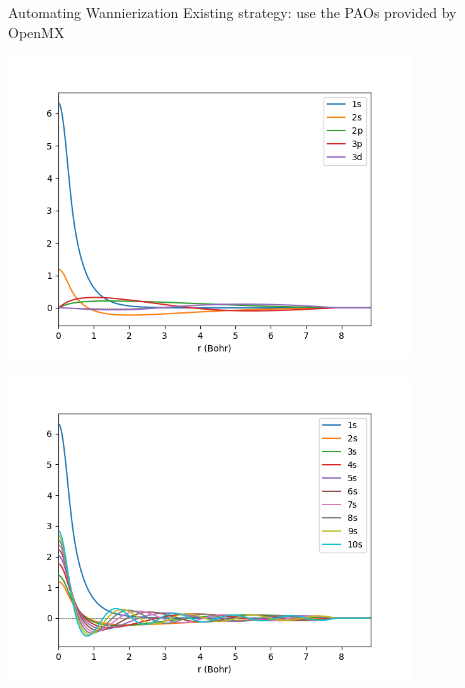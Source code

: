 \documentclass[xcolor=table,aspectratio=169]{beamer}
\numberwithin{equation}{section}
\begin{document}
\begin{frame}{Automating Wannierization}
    Existing strategy: use the PAOs provided by OpenMX

    \includegraphics[width=0.8\textwidth]{figures/Li8.0.pao_2_2_1_0.png}

    \includegraphics[width=0.8\textwidth]{figures/Li8.0.pao_10_0_0_0.png}

\end{frame}
\end{document}

